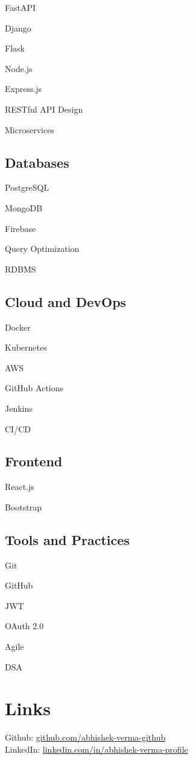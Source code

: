 \documentclass[letterpaper]{deedy-resume}
\begin{document}
\begin{minipage}[t]{0.33\textwidth}
FastAPI \textbullet{} 

Django \textbullet{} 

Flask \textbullet{} 

Node.js \textbullet{} 

Express.js \textbullet{} 

RESTful API Design \textbullet{} 

Microservices

\sectionsep

\subsection{Databases}

PostgreSQL \textbullet{} 

MongoDB \textbullet{} 

Firebase \textbullet{} 

Query Optimization \textbullet{} 

RDBMS

\sectionsep

\subsection{Cloud and DevOps}

Docker \textbullet{} 

Kubernetes \textbullet{} 

AWS \textbullet{} 

GitHub Actions \textbullet{} 

Jenkins \textbullet{} 

CI/CD

\sectionsep

\subsection{Frontend}

React.js \textbullet{} 

Bootstrap

\sectionsep

\subsection{Tools and Practices}

Git \textbullet{} 

GitHub \textbullet{} 

JWT \textbullet{} 

OAuth 2.0 \textbullet{} 

Agile \textbullet{} 

DSA

\sectionsep


\section{Links} 
Github: \href{https://github.com/abhishek-verma-github}{github.com/abhishek-verma-github} \\
LinkedIn: \href{https://linkedin.com/in/abhishek-verma-profile}{linkedin.com/in/abhishek-verma-profile}
\sectionsep 
\end{minipage} 
\end{document}
